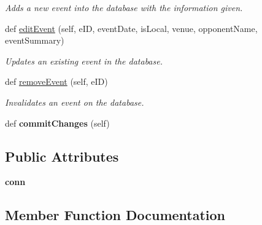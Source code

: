 \begin{DoxyCompactItemize}
\begin{DoxyCompactList}\small\item\em Adds a new event into the database with the information given. \end{DoxyCompactList}\item 
def \hyperlink{classhandler_1_1dao_1_1event__dao_1_1_event_d_a_o_af2b2e609a3c1ba67cbe472852bb46c60}{edit\+Event} (self, e\+ID, event\+Date, is\+Local, venue, opponent\+Name, event\+Summary)
\begin{DoxyCompactList}\small\item\em Updates an existing event in the database. \end{DoxyCompactList}\item 
def \hyperlink{classhandler_1_1dao_1_1event__dao_1_1_event_d_a_o_a3d8c4ff8a724203eeacb90e6cb84450e}{remove\+Event} (self, e\+ID)
\begin{DoxyCompactList}\small\item\em Invalidates an event on the database. \end{DoxyCompactList}\item 
\mbox{\label{classhandler_1_1dao_1_1event__dao_1_1_event_d_a_o_ae7236c64bac6acc44feb3bc486a2c2a4}} 
def {\bfseries commit\+Changes} (self)
\end{DoxyCompactItemize}
\subsection*{Public Attributes}
\begin{DoxyCompactItemize}
\item 
\mbox{\label{classhandler_1_1dao_1_1event__dao_1_1_event_d_a_o_a18db499e8f41f67bb40bc8fbce49f187}} 
{\bfseries conn}
\end{DoxyCompactItemize}


\subsection{Member Function Documentation}
\mbox{\label{classhandler_1_1dao_1_1event__dao_1_1_event_d_a_o_a05ea963dea054f4258b89b6bcbf87945}} 
